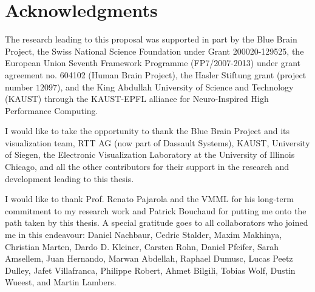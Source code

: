 

\chapter*{Acknowledgments}
The research leading to this proposal was supported in part by the Blue Brain
Project, the Swiss National Science Foundation under Grant 200020-129525, the
European Union Seventh Framework Programme (FP7/2007-2013) under grant agreement
no. 604102 (Human Brain Project), the Hasler Stiftung grant (project number
$12097$), and the King Abdullah University of Science and Technology (KAUST)
through the KAUST-EPFL alliance for Neuro-Inspired High Performance Computing.

I would like to take the opportunity to thank the Blue Brain Project and its
visualization team, RTT AG (now part of Dassault Systems), KAUST, University of
Siegen, the Electronic Visualization Laboratory at the University of Illinois
Chicago, and all the other contributors for their support in the research and
development leading to this thesis.

I would like to thank Prof. Renato Pajarola and the VMML for his long-term
commitment to my research work and Patrick Bouchaud for putting me onto the
path taken by this thesis. A special gratitude goes to all collaborators who
joined me in this endeavour: Daniel Nachbaur, Cedric Stalder, Maxim Makhinya,
Christian Marten, Dardo D. Kleiner, Carsten Rohn, Daniel Pfeifer, Sarah
Amsellem, Juan Hernando, Marwan Abdellah, Raphael Dumusc, Lucas Peetz Dulley,
Jafet Villafranca, Philippe Robert, Ahmet Bilgili, Tobias Wolf, Dustin Wueest,
and Martin Lambers.

